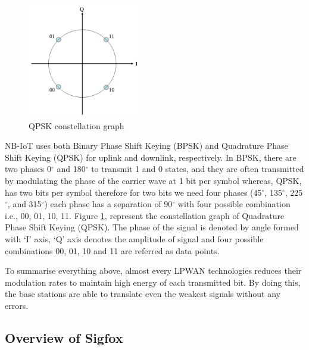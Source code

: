 \documentclass[12pt]{article}
\begin{document}
  \begin{figure}[H]
      \centering
      \includegraphics[width=0.5 \columnwidth, height=5cm, keepaspectratio
      ]{Images/QPSK.pdf}
      \caption{QPSK constellation graph}
      \label{fig:QPSK constellation graph}
  \end{figure}
  NB-IoT uses both Binary Phase Shift Keying (BPSK) and Quadrature Phase Shift Keying (QPSK) for uplink and downlink, respectively. In BPSK, there are two phases 0$^{\circ}$ and 180$^{\circ}$ to transmit 1 and 0 states, and they are often transmitted by modulating the phase of the carrier wave at 1 bit per symbol whereas, QPSK, has two bits per symbol therefore for two bits we need four phases (45$^{\circ}$, 135$^{\circ}$, 225$^{\circ}$, and 315$^{\circ}$) each phase has a separation of 90$^{\circ}$ with four possible combination i.e., 00, 01, 10, 11. Figure \ref{fig:QPSK constellation graph}, represent the constellation graph of Quadrature Phase Shift Keying (QPSK). The phase of the signal is denoted by angle formed with `I' axis, `Q' axis denotes the amplitude of signal and four possible combinations 00, 01, 10 and 11 are referred as data points.
  

   
 
 To summarise everything above, almost every LPWAN technologies reduces their modulation rates to maintain high energy of each transmitted bit. By doing this, the base stations are able to translate even the weakest signals without any errors.


\subsection{Overview of Sigfox}\label{sigfox technical}
\end{document}
